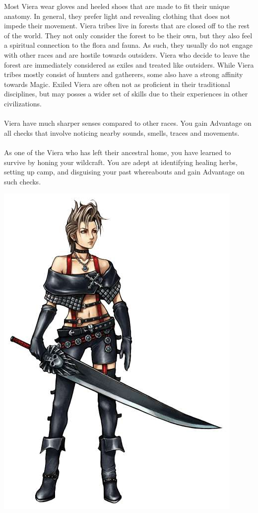 Most Viera wear gloves and heeled shoes that are made to fit their unique anatomy.
In general, they prefer light and revealing clothing that does not impede their movement.
Viera tribes live in forests that are closed off to the rest of the world.
They not only consider the forest to be their own, but they also feel a spiritual connection to the flora and fauna.
As such, they usually do not engage with other races and are hostile towards outsiders.
Viera who decide to leave the forest are immediately considered as exiles and treated like outsiders.
While Viera tribes mostly consist of hunters and gatherers, some also have a strong affinity towards Magic.
Exiled Viera are often not as proficient in their traditional disciplines, but may posses a wider set of skills due to their experiences in other civilizations.
%
\\\\
%
 Viera have much sharper senses compared to other races.
You gain Advantage on all checks that involve noticing nearby sounds, smells, traces and movements.
%
\\\\
%
 As one of the Viera who has left their ancestral home, you have learned to survive by honing your wildcraft. You are adept at identifying healing herbs, setting up camp, and disguising your past whereabouts and gain Advantage on such checks.
%
\clearpage
%
%
\begin{center} \includegraphics[width=0.9\columnwidth]{./art/races/human.jpg} \end{center}
